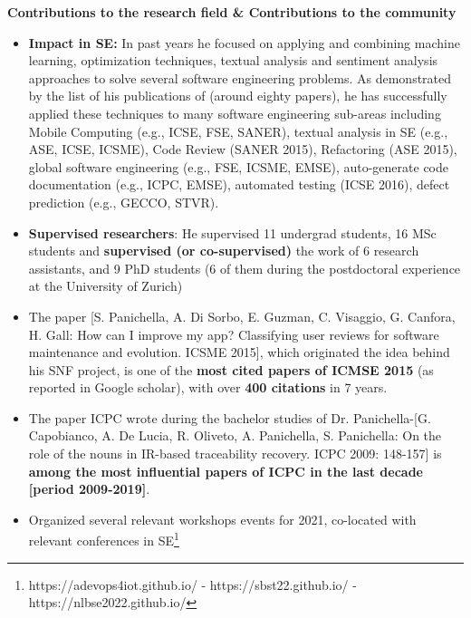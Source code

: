 \documentclass[11pt]{article}
\begin{document}
\textbf{Contributions to the research field \& Contributions to the community}
\vspace{-2.5mm}
\begin{itemize}
\item \textbf{Impact in SE:} In past years he focused on applying and combining machine learning, optimization techniques, textual analysis and sentiment analysis approaches to solve several software engineering problems. As demonstrated by the list of his publications of (around eighty papers), he has successfully applied these techniques to many software engineering sub-areas including Mobile Computing (e.g., ICSE, FSE, SANER), textual analysis in SE (e.g., ASE, ICSE, ICSME), Code Review (SANER 2015), Refactoring (ASE 2015), global software engineering (e.g., FSE, ICSME, EMSE), auto-generate code documentation (e.g., ICPC, EMSE), automated testing (ICSE 2016), defect prediction (e.g., GECCO, STVR). 
  \vspace{-2mm}
  \item 
  \textbf{Supervised researchers}: He supervised 11 undergrad students, 16 MSc students and \textbf{supervised (or co-supervised)} the work of 6 research assistants, and 9 PhD students (6 of them during the postdoctoral experience at the University of Zurich)
  \vspace{-2mm} 
 \item The paper [S. Panichella, A. Di Sorbo, E. Guzman, C. Visaggio, G. Canfora, H. Gall: How can I improve my app? Classifying user reviews for software maintenance and evolution. ICSME 2015], which originated the idea behind his SNF project, is one of the \textbf{most cited papers of ICMSE 2015} (as reported in Google scholar), with over \textbf{400 citations} in 7 years.   
 \vspace{-2mm}
  \item The paper ICPC wrote during the bachelor studies of Dr. Panichella-[G. Capobianco, A. De Lucia, R. Oliveto, A. Panichella, S. Panichella: On the role of the nouns in IR-based traceability recovery. ICPC 2009: 148-157] is \textbf{among the most influential papers of ICPC in the last decade [period 2009-2019]}.
  \vspace{-2mm}
 \item Organized several relevant workshops events for 2021, co-located with relevant conferences in SE\footnote{https://adevops4iot.github.io/
-	https://sbst22.github.io/
-	https://nlbse2022.github.io/}
  \vspace{-2mm}
\end{itemize}
\end{document}
